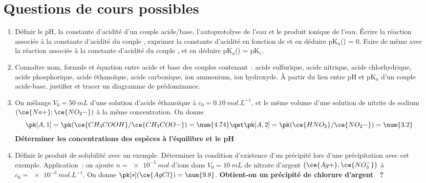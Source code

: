 \documentclass[a4paper, 12pt, final, garamond]{book}
\begin{document}
\section{Questions de cours possibles}
\begin{enumerate}[label=\sqenumi]
	\item Définir le pH, la constante d'acidité d'un couple acide/base,
	      l'autoprotolyse de l'eau et le produit ionique de l'eau. Écrire la
	      réaction associée à la constante d'acidité du couple ,
	      exprimer la constante d'acidité en fonction de \ce{[H3O+]} et en déduire
	      pK$_a$() = 0. Faire de même avec la réaction associée à la
	      constante d'acidité du couple , et en déduire
	      pK$_a$() = pK$_e$.
	\item Connaître nom, formule et équation entre acide et base des couples
	      contenant~: acide sulfurique, acide nitrique, acide chlorhydrique, acide
	      phosphorique, acide éthanoïque, acide carbonique, ion ammonium, ion
	      hydroxyde. À partir du lien entre pH et pK$_a$ d'un couple acide-base,
	      justifier et tracer un diagramme de prédominance.
	\item On mélange $V_0 = \SI{50}{mL}$ d'une solution d'acide éthanoïque à $c_0
		      = \SI{0.10}{mol.L^{-1}}$, et le même volume d'une solution de nitrite de
	      sodium $\left( \ce{Na+};\ce{NO_2-} \right)$ à la même concentration. On
	      donne
	      \[
		      \pk[A,1] = \pk(\ce{CH_3COOH}/\ce{CH_3COO-}) = \num{4.74}
		      \qet
		      \pk[A,2] = \pk(\ce{HNO_2}/\ce{NO_2-}) = \num{3.2}
	      \]
	      \textbf{Déterminer les concentrations des espèces à l'équilibre et le
		      pH}

	\item Définir le produit de solubilité avec un exemple. Déterminer la
	      condition d'existence d'un précipité lors d'une précipitation avec cet
	      exemple. Application~: on ajoute $n = \SI{e-5}{mol}$ d'ions 
	      dans $V_0 = \SI{10}{mL}$ de nitrate d'argent $\left(\ce{Ag+},
		      \ce{NO_3^-}
		      \right)$ à $c_0 = \SI{e-3}{mol.L^{-1}}$. On donne $\pk[s](\ce{AgCl}) =
		      \num{9.8}$. \textbf{Obtient-on un précipité de chlorure d'argent
		      ~?}


\end{enumerate}
\end{document}
